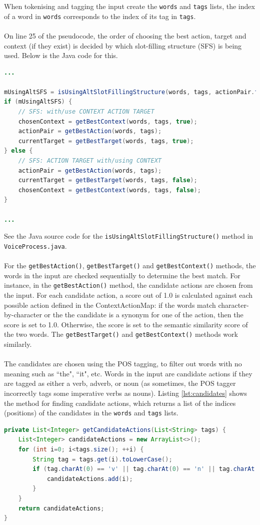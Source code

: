 \documentclass[11pt]{article}
\begin{document}
When tokenising and tagging the input create the \texttt{words} and \texttt{tags} lists, the index of a word in \texttt{words} corresponds to the index of its tag in \texttt{tags}.
\\
\\
On line 25 of the pseudocode, the order of choosing the best action, target and context (if they exist) is decided by which slot-filling structure (SFS) is being used. Below is the Java code for this.
\\
\begin{lstlisting}[language=Java, label={lst:sfs}]
...

mUsingAltSFS = isUsingAltSlotFillingStructure(words, tags, actionPair.first);
if (mUsingAltSFS) {
    // SFS: with/use CONTEXT ACTION TARGET
    chosenContext = getBestContext(words, tags, true);
    actionPair = getBestAction(words, tags);
    currentTarget = getBestTarget(words, tags, true);
} else {
    // SFS: ACTION TARGET with/using CONTEXT
    actionPair = getBestAction(words, tags);
    currentTarget = getBestTarget(words, tags, false);
    chosenContext = getBestContext(words, tags, false);
}

...
\end{lstlisting}

See the Java source code for the \texttt{isUsingAltSlotFillingStructure()} method in \texttt{VoiceProcess.java}.
\\
\\
For the \texttt{getBestAction()}, \texttt{getBestTarget()} and  \texttt{getBestContext()} methods, the words in the input are checked sequentially to determine the best match. For instance, in the \texttt{getBestAction()} method, the candidate actions are chosen from the input. For each candidate action, a score out of 1.0 is calculated against each possible action defined in the ContextActionMap: if the words match character-by-character or the the candidate is a synonym for one of the action, then the score is set to 1.0. Otherwise, the score is set to the semantic similarity score of the two words. The \texttt{getBestTarget()} and \texttt{getBestContext()} methods work similarly.
\\
\\
The candidates are chosen using the POS tagging, to filter out words with no meaning such as ``the", ``it", etc. Words in the input are candidate actions if they are tagged as either a verb, adverb, or noun (as sometimes, the POS tagger incorrectly tags some imperative verbs as nouns). Listing \ref{lst:candidates} shows the method for finding candidate actions, which returns a list of the indices (positions) of the candidates in the \texttt{words} and \texttt{tags} lists.
\\
\begin{lstlisting}[language=Java, caption=getCandidateActions(), label={lst:candidates}]
private List<Integer> getCandidateActions(List<String> tags) {
    List<Integer> candidateActions = new ArrayList<>();
    for (int i=0; i<tags.size(); ++i) {
        String tag = tags.get(i).toLowerCase();
        if (tag.charAt(0) == 'v' || tag.charAt(0) == 'n' || tag.charAt(0) == 'j') {
            candidateActions.add(i);
        }
    }
    return candidateActions;
}
\end{lstlisting}
\end{document}
